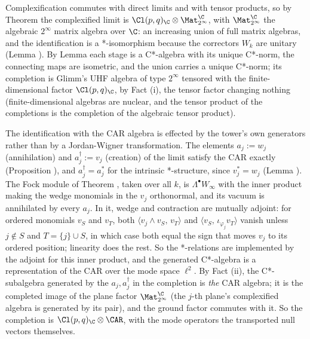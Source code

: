 Complexification commutes with direct limits and with tensor products, so by Theorem  the complexified limit is $\Cl(p,q)_\C \otimes \Mat_{2^\infty}^\C$, with $\Mat_{2^\infty}^\C$ the algebraic $2^\infty$ matrix algebra over $\C$: an increasing union of full matrix algebras, and the identification is a *-isomorphism because the correctors $W_k$ are unitary (Lemma ). By Lemma  each stage is a C*-algebra with its unique C*-norm, the connecting maps are isometric, and the union carries a unique C*-norm; its completion is Glimm's UHF algebra of type $2^\infty$ tensored with the finite-dimensional factor $\Cl(p,q)_\C$, by Fact (i), the tensor factor changing nothing (finite-dimensional algebras are nuclear, and the tensor product of the completions is the completion of the algebraic tensor product).

The identification with the CAR algebra is effected by the tower's own generators rather than by a Jordan-Wigner transformation. The elements $a_j := w_j$ (annihilation) and $a_j^\dagger := v_j$ (creation) of the limit satisfy the CAR exactly (Proposition ), and $a_j^\dagger = a_j^*$ for the intrinsic *-structure, since $v_j^* = w_j$ (Lemma ). The Fock module of Theorem , taken over all $k$, is $\Lambda^\bullet W_\infty$ with the inner product making the wedge monomials in the $v_j$ orthonormal, and its vacuum is annihilated by every $a_j$. In it, wedge and contraction are mutually adjoint: for ordered monomials $v_S$ and $v_T$, both $\langle v_j \wedge v_S,\, v_T \rangle$ and $\langle v_S,\, \iota_{\varphi_j} v_T \rangle$ vanish unless $j \notin S$ and $T = \{j\} \cup S$, in which case both equal the sign that moves $v_j$ to its ordered position; linearity does the rest. So the *-relations are implemented by the adjoint for this inner product, and the generated C*-algebra is a representation of the CAR over the mode space $\ell^2$. By Fact (ii), the C*-subalgebra generated by the $a_j, a_j^\dagger$ in the completion is \emph{the} CAR algebra; it is the completed image of the plane factor $\Mat_{2^\infty}^\C$ (the $j$-th plane's complexified algebra is generated by its pair), and the ground factor commutes with it. So the completion is $\Cl(p,q)_\C \otimes \CAR$, with the mode operators the transported null vectors themselves.

